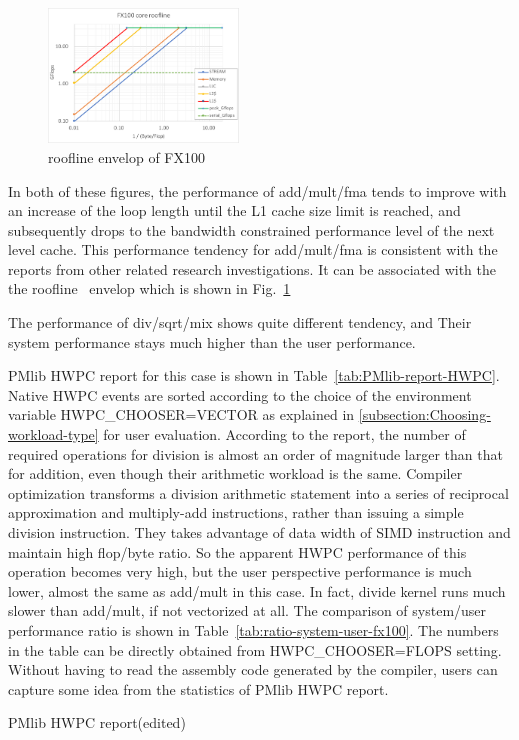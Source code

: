 \documentclass[conference]{IEEEtran}
\begin{document}
\begin{figure}[tb]
\includegraphics[width=0.45\textwidth]{figs/roofline-fx100.pdf}
\caption{roofline envelop of FX100}
\label{fig:roofline-fx100}
\end{figure}

In both of these figures,
the performance of add/mult/fma tends to improve with an increase of
the loop length until the L1 cache size limit is reached,
and subsequently drops to the bandwidth constrained performance level
of the next level cache.
This performance tendency for add/mult/fma is consistent with the reports
from other related research investigations.
It can be associated with the
the roofline~\cite{Williams:2009}
envelop which is shown in Fig.~\ref{fig:roofline-fx100}

The performance of div/sqrt/mix shows quite different tendency, and
Their system performance stays much higher than the user performance.

PMlib HWPC report for this case is shown in Table~\ref{tab:PMlib-report-HWPC}.
Native HWPC events are sorted according to the choice of the
environment variable HWPC\_CHOOSER=VECTOR as explained in
\ref{subsection:Choosing-workload-type} for user evaluation.
According to the report,
the number of required operations for division is almost an order of magnitude
larger than that for addition, even though their arithmetic workload
is the same.
Compiler optimization transforms
a division arithmetic statement into a series of reciprocal
approximation and multiply-add instructions, rather than issuing
a simple division instruction. They takes advantage of
data width of SIMD instruction and maintain high flop/byte ratio.
So the apparent HWPC performance of this operation becomes very high,
but the user perspective performance is much lower, almost the same as
add/mult in this case. In fact, divide kernel runs much slower than add/mult,
if not vectorized at all.
The comparison of system/user performance ratio is shown in
Table~\ref{tab:ratio-system-user-fx100}. The numbers in the table can be
directly obtained from HWPC\_CHOOSER=FLOPS setting.
Without having to read the assembly code generated by the compiler,
users can capture some idea from the statistics of PMlib HWPC report.
\begin{table}[b]
\centering
\caption{PMlib HWPC report(edited)}
\label{tab:PMlib-report-HWPC}
\footnotesize

\end{table}
\end{document}
